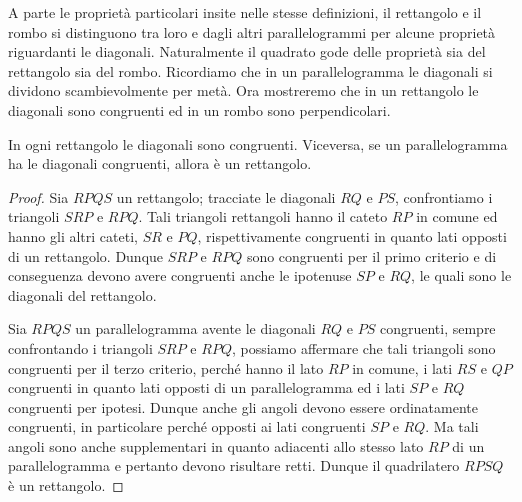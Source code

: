 A parte le proprietà particolari insite nelle stesse definizioni, il 
rettangolo e il rombo si distinguono tra loro e dagli altri 
parallelogrammi per alcune proprietà riguardanti le diagonali. 
Naturalmente il quadrato gode delle proprietà sia del rettangolo sia 
del rombo.
Ricordiamo che in un parallelogramma le diagonali si dividono 
scambievolmente per metà. Ora mostreremo che in un rettangolo le 
diagonali sono congruenti ed in un rombo sono perpendicolari.

\begin{teorema}
In ogni rettangolo le diagonali sono congruenti. Viceversa, se un 
parallelogramma ha le diagonali congruenti, allora è un rettangolo.
\end{teorema}

\begin{inaccessibleblock}
\begin{center}\end{center}
\end{inaccessibleblock}

\begin{proof}
Sia \(RPQS\) un rettangolo; tracciate le diagonali \(RQ\) e \(PS\), 
confrontiamo i triangoli \(SRP\) e \(RPQ\). Tali triangoli rettangoli 
hanno il cateto \(RP\) in comune ed hanno gli altri cateti, \(SR\) e 
\(PQ\), rispettivamente congruenti in quanto lati opposti di un 
rettangolo. Dunque \(SRP\) e \(RPQ\) sono congruenti per il primo criterio 
e di conseguenza devono avere congruenti anche le ipotenuse \(SP\) e 
\(RQ\), le quali sono le diagonali del rettangolo.

Sia \(RPQS\) un parallelogramma avente le diagonali \(RQ\) e \(PS\) 
congruenti, sempre confrontando i triangoli \(SRP\) e \(RPQ\), possiamo 
affermare che tali triangoli sono congruenti per il terzo criterio, 
perché hanno il lato \(RP\) in comune, i lati \(RS\) e \(QP\) congruenti in 
quanto lati opposti di un parallelogramma ed i lati \(SP\) e \(RQ\) 
congruenti per ipotesi. Dunque anche gli angoli devono essere 
ordinatamente congruenti, in particolare  perché opposti ai lati 
congruenti \(SP\) e \(RQ\). Ma tali angoli sono anche supplementari in 
quanto adiacenti allo stesso lato \(RP\) di un parallelogramma e 
pertanto devono risultare retti. Dunque il quadrilatero \(RPSQ\) è un 
rettangolo.
\end{proof}

